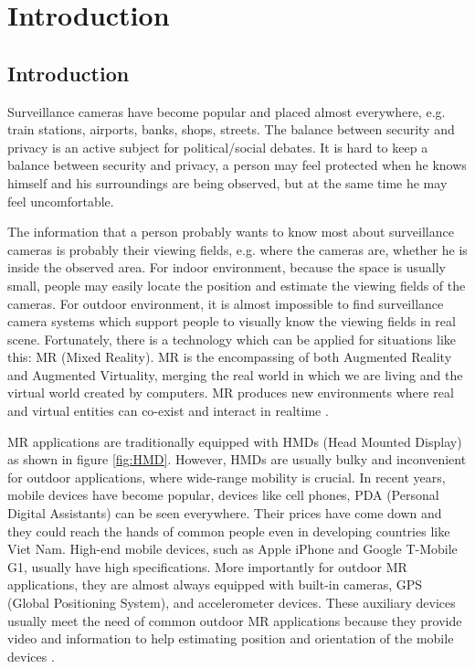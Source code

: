 \chapter{Introduction} %
\label{Chapter1}


\section{Introduction}

Surveillance cameras have become popular and placed almost everywhere, e.g. train stations, airports, banks, shops, streets. The balance between security and privacy is an active subject for political/social debates. It is hard to keep a balance between security and privacy, a person may feel protected when he knows himself and his surroundings are being observed, but at the same time he may feel uncomfortable.

The information that a person probably wants to know most about surveillance cameras is probably their viewing fields, e.g. where the cameras are, whether he is inside the observed area. For indoor environment, because the space is usually small, people may easily locate the position and estimate the viewing fields of the cameras. For outdoor environment, it is almost impossible to find surveillance camera systems which support people to visually know the viewing fields in real scene. Fortunately, there is a technology which can be applied for situations like this: MR (Mixed Reality). MR is the encompassing of both Augmented Reality and Augmented Virtuality, merging the real world in which we are living and the virtual world created by computers. MR produces new environments where real and virtual entities can co-exist and interact in realtime \citep{Reference3}.

MR applications are traditionally equipped with HMDs (Head Mounted Display) as shown in figure \ref{fig:HMD}. However, HMDs are usually bulky and inconvenient for outdoor applications, where wide-range mobility is crucial. In recent years, mobile devices have become popular, devices like cell phones, PDA (Personal Digital Assistants) can be seen everywhere. Their prices have come down and they could reach the hands of common people even in developing countries like Viet Nam. High-end mobile devices, such as Apple iPhone and Google T-Mobile G1, usually have high specifications. More importantly for outdoor MR applications, they are almost always equipped with built-in cameras, GPS (Global Positioning System), and accelerometer devices. These auxiliary devices usually meet the need of common outdoor MR applications because they provide video and information to help estimating position and orientation of the mobile devices \citep{Reference2} \citep{Reference4}.

